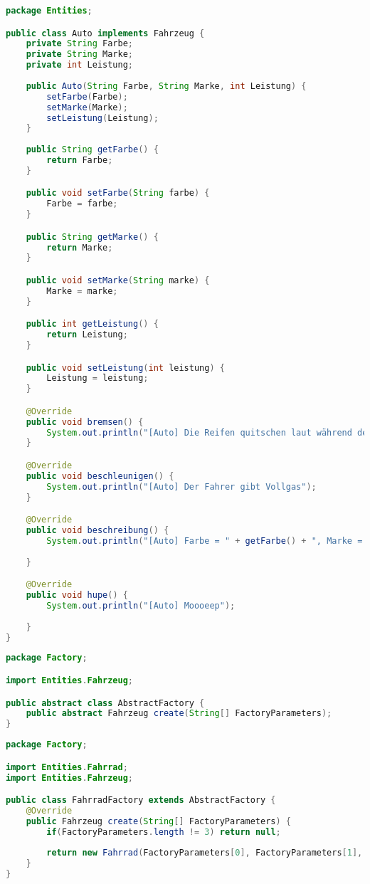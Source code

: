 \begin{lstlisting}[language=java, style=java, caption={Auto.java},
label={lst:lst4}]
package Entities;

public class Auto implements Fahrzeug {
	private String Farbe;
	private String Marke;
	private int Leistung;
	
	public Auto(String Farbe, String Marke, int Leistung) {
		setFarbe(Farbe);
		setMarke(Marke);
		setLeistung(Leistung);
	}
	
	public String getFarbe() {
		return Farbe;
	}

	public void setFarbe(String farbe) {
		Farbe = farbe;
	}

	public String getMarke() {
		return Marke;
	}

	public void setMarke(String marke) {
		Marke = marke;
	}

	public int getLeistung() {
		return Leistung;
	}

	public void setLeistung(int leistung) {
		Leistung = leistung;
	}

	@Override
	public void bremsen() {
		System.out.println("[Auto] Die Reifen quitschen laut während des Bremsens.");
	}

	@Override
	public void beschleunigen() {
		System.out.println("[Auto] Der Fahrer gibt Vollgas");
	}

	@Override
	public void beschreibung() {
		System.out.println("[Auto] Farbe = " + getFarbe() + ", Marke = " + getMarke() + ", Leistung = " + getLeistung());
		
	}

	@Override
	public void hupe() {
		System.out.println("[Auto] Moooeep");
		
	}
}
\end{lstlisting}


\begin{lstlisting}[language=java, style=java, caption={AbstractFactory.java},
label={lst:lst5}]
package Factory;

import Entities.Fahrzeug;

public abstract class AbstractFactory {
	public abstract Fahrzeug create(String[] FactoryParameters);
}
\end{lstlisting}

\begin{lstlisting}[language=java, style=java, caption={FahrradFactory.java},
label={lst:lst6}]
package Factory;

import Entities.Fahrrad;
import Entities.Fahrzeug;

public class FahrradFactory extends AbstractFactory {
	@Override
	public Fahrzeug create(String[] FactoryParameters) {
		if(FactoryParameters.length != 3) return null;
		
		return new Fahrrad(FactoryParameters[0], FactoryParameters[1], FactoryParameters[2]);
	}
}
\end{lstlisting}

